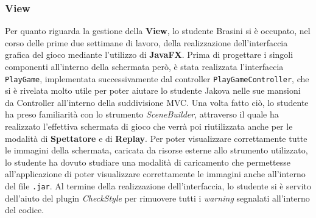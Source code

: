      \clearpage

     \subsubsection{View}\label{subsub:brasini:view}
     Per quanto riguarda la gestione della \textbf{View}, lo studente Brasini si è occupato, nel corso delle prime due settimane di lavoro, della realizzazione dell'interfaccia grafica del gioco mediante l'utilizzo di \textbf{JavaFX}. Prima di progettare i singoli componenti all'interno della schermata però, è stata realizzata l'interfaccia \texttt{PlayGame}, implementata successivamente dal controller \texttt{PlayGameController}, che si è rivelata molto utile per poter aiutare lo studente Jakova nelle sue mansioni da Controller all'interno della suddivisione MVC. Una volta fatto ciò, lo studente ha preso familiarità con lo strumento \textit{SceneBuilder}, attraverso il quale ha realizzato l'effettiva schermata di gioco che verrà poi riutilizzata anche per le modalità di \textbf{Spettatore} e di \textbf{Replay}. Per poter visualizzare correttamente tutte le immagini della schermata, caricata da risorse esterne allo strumento utilizzato, lo studente ha dovuto studiare una modalità di caricamento che permettesse all'applicazione di poter visualizzare correttamente le immagini anche all'interno del file \texttt{.jar}. Al termine della realizzazione dell'interfaccia, lo studente si è servito dell'aiuto del plugin \textit{CheckStyle} per rimuovere tutti i \textit{warning} segnalati all'interno del codice.


